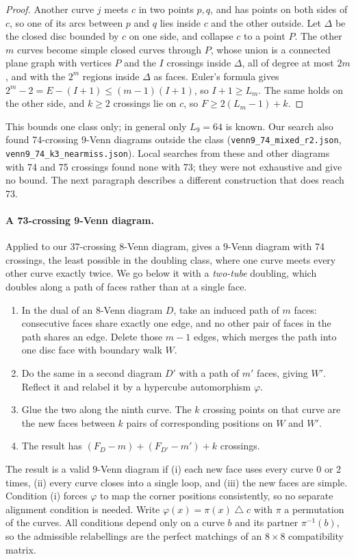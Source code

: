 \documentclass[11pt]{article}
\theoremstyle{remark}
\begin{document}
\begin{proof}
Another curve $j$ meets $c$ in two points $p,q$, and has points on both sides of $c$, so one of its arcs between $p$
and $q$ lies inside $c$ and the other outside. Let $\Delta$ be the closed disc bounded by $c$ on one side, and
collapse $c$ to a point $P$. The other $m$ curves become simple closed curves through $P$, whose union is a connected
plane graph with vertices $P$ and the $I$ crossings inside $\Delta$, all of degree at most $2m$, and with the $2^m$
regions inside $\Delta$ as faces. Euler's formula gives $2^m-2=E-(I+1)\le(m-1)(I+1)$, so $I+1\ge L_m$. The same holds
on the other side, and $k\ge2$ crossings lie on $c$, so $F\ge2(L_m-1)+k$.
\end{proof}

This bounds one class only; in general only $L_9=64$ is known. Our search also found 74-crossing $9$-Venn diagrams
outside the class (\texttt{venn9\_74\_mixed\_r2.json}, \texttt{venn9\_74\_k3\_nearmiss.json}). Local searches from
these and other diagrams with 74 and 75 crossings found none with 73; they were not exhaustive and give no bound.
The next paragraph describes a different construction that does reach 73.

\paragraph{A 73-crossing 9-Venn diagram.} Applied to our 37-crossing 8-Venn diagram, \cite[Lemma~10]{BGMV} gives a
$9$-Venn diagram with 74 crossings, the least possible in the doubling class, where one curve meets every other curve
exactly twice. We go below it with a \emph{two-tube} doubling, which doubles along a path of faces rather than at a
single face.
\begin{enumerate}
\item In the dual of an $8$-Venn diagram $D$, take an induced path of $m$ faces: consecutive faces share exactly one
edge, and no other pair of faces in the path shares an edge. Delete those $m-1$ edges, which merges the path into one
disc face with boundary walk $W$.
\item Do the same in a second diagram $D'$ with a path of $m'$ faces, giving $W'$. Reflect it and relabel it by a
hypercube automorphism $\varphi$.
\item Glue the two along the ninth curve. The $k$ crossing points on that curve are the new faces between $k$ pairs
of corresponding positions on $W$ and $W'$.
\item The result has $(F_D-m)+(F_{D'}-m')+k$ crossings.
\end{enumerate}
The result is a valid $9$-Venn diagram if (i) each new face uses every curve 0 or 2 times, (ii) every curve closes
into a single loop, and (iii) the new faces are simple. Condition (i) forces $\varphi$ to map the corner positions
consistently, so no separate alignment condition is needed. Write $\varphi(x)=\pi(x)\mathbin{\triangle}c$ with $\pi$ a
permutation of the curves. All conditions depend only on a curve $b$ and its partner $\pi^{-1}(b)$, so the admissible
relabellings are the perfect matchings of an $8\times8$ compatibility matrix.
\end{document}

